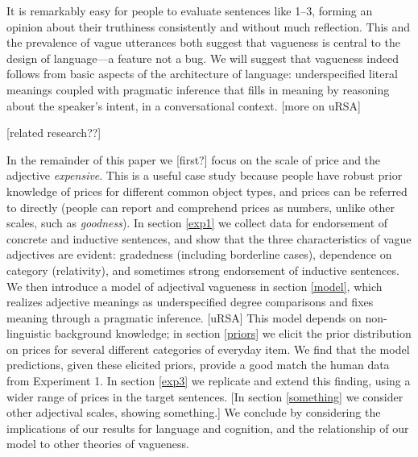 \documentclass[11pt]{amsart}
\newcommand{\ndg}[1]{{\color{ForestGreen}[#1]}}
\begin{document}
It is remarkably easy for people to evaluate sentences like 1--3, forming an opinion about their truthiness consistently and without much reflection. This and the prevalence of vague utterances both suggest that vagueness is central to the design of language---a feature not a bug. We will suggest that vagueness indeed follows from basic aspects of the architecture of language: underspecified literal meanings coupled with pragmatic inference that fills in meaning by reasoning about the speaker's intent, in a conversational context.
\ndg{more on uRSA}

\ndg{related research??}
\cite{Dzhafarov2014}

In the remainder of this paper we \ndg{first?} focus on the scale of price and the adjective \emph{expensive}. This is a useful case study because people have robust prior knowledge of prices for different common object types, and prices can be referred to directly (people can report and comprehend prices as numbers, unlike other scales, such as \emph{goodness}).
In section \ref{exp1} we collect data for endorsement of concrete and inductive sentences, and show that the three characteristics of vague adjectives are evident: gradedness (including borderline cases), dependence on category (relativity), and sometimes strong endorsement of inductive sentences.
We then introduce a model of adjectival vagueness in section \ref{model}, which realizes adjective meanings as underspecified degree comparisons and fixes meaning through a pragmatic inference. \ndg{uRSA}
This model depends on non-linguistic background knowledge; in section \ref{priors} we elicit the prior distribution on prices for several different categories of everyday item.
We find that the model predictions, given these elicited priors, provide a good match the human data from Experiment 1.
In section \ref{exp3} we replicate and extend this finding, using a wider range of prices in the target sentences.
\ndg{In section \ref{something} we consider other adjectival scales, showing something.}
We conclude by considering the implications of our results for language and cognition, and the relationship of our model to other theories of vagueness.
\end{document}

